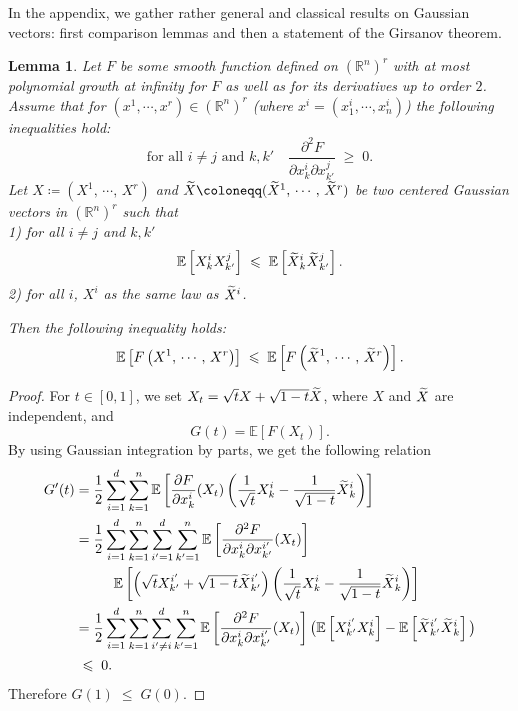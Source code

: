 \documentclass[10pt]{amsart}
\newtheorem{lemm}[theo]{Lemma}\newtheorem{prop}[theo]{Proposition}\newtheorem{coro}[theo]{Corollary}\newtheorem{conj}[theo]{Conjecture}
\theoremstyle{definition}\newtheorem{defi}[theo]{Definition}\newtheorem{rema}[theo]{Remark}\newtheorem{exam}[theo]{Example}\newtheorem{exem}[theo]{Example}\newtheorem{nota}[theo]{Notation}
\renewcommand{\tilde}{\widetilde}
\renewcommand{\leq}{\;\leqslant\;}
\renewcommand{\geq}{\;\geqslant\;}
\newcommand{\R}{\mathbb{R}}
\newcommand{\E}{\mathbb{E}}
\newcommand*\green[1]{#1}
\let\oldtilde\tilde
\renewcommand*{\tilde}[1]{\mathchoice{\widetilde{#1}}{\widetilde{#1}}{\oldtilde{#1}}{\oldtilde{#1}}}
\begin{document}
In the appendix, we gather rather general and classical results on Gaussian vectors: first comparison lemmas and then a statement of the Girsanov theorem.

\begin{lemm}\label{kah2}
Let $F$ be some smooth function defined on $(\R^n)^{\green r}$ with at most polynomial growth at infinity for $F$ as well as for its derivatives up to order $2$. Assume that for $(x^1, \cdots, x^{\green r}) \in (\R^n)^{\green r}$ (where $x^i= (x^i_1, \cdots, x^i_n)$) the following inequalities hold:
\begin{equation*}
\text{for all $i \not = j$ and $k,k'$}\quad \frac{\partial^2 F}{\partial x^i_k \partial x^j_{k'} } \geq 0.
\end{equation*}
Let $X\coloneqq (X^1,\,\cdots,\, X^{\green r})$ and $\tilde X\coloneqq (\tilde{X}^1,\, \cdots,\, \tilde{X}^{\green r})$ be two centered Gaussian vectors in $(\R^n)^{\green r}$ such that \\
1) for all $i \not = j$ and $k,k'$
\begin{equation*}
\E\left[X^i_k X^j_{k'}\right] \leq \E\left[\tilde{X}^i_k\tilde{X}^j_{k'}\right].
\end{equation*}
2) for all $i $, $X^i$ as the same law as $\tilde{X}^i$.

Then the following inequality holds:
\begin{equation*}
\E\left[F\left(X^1,\,\cdots,\, X^{r}\right)\right] \leq \E\left[F\left(\tilde{X}^1,\, \cdots,\, \tilde{X}^{r}\right)\right].
\end{equation*}
\end{lemm}


\begin{proof} 
For $t\in [0,1]$, we set $X_t= \sqrt{t} X+\sqrt{1-t} \tilde{X}$, where $X$ and $\tilde{X}$ are independent, and
\begin{equation*}
G(t)= \E[F(X_t)].
\end{equation*}
By using Gaussian integration by parts, we get the following relation
\begin{align*}
G'(t)
& = \frac{1}{2} \sum_{i=1}^d \sum_{k=1}^n \E \left[\frac{\partial F} {\partial x^i_k } (X_t) \left(\frac{1}{\sqrt t} X^i_k - \frac{1}{\sqrt {1-t}} \tilde{X}^i_k\right) \right] \\
& = \frac{1}{2} \sum_{i=1}^d \sum_{k=1}^n \sum_{i'=1}^d \sum_{k'=1}^n \E \left [\frac{\partial^2 F} {\partial x^i_k \partial x^{i'}_{k'} } (X_t) \right]\\
&\mkern50mu\E \left [\left(\sqrt t X^{i'}_{k'} +\sqrt {1-t} \tilde{X}^{i'}_{k'}\right) \left(\frac{1}{\sqrt t} X^i_k - \frac{1}{\sqrt {1-t}} \tilde{X}^i_k\right) \right] \\
& = \frac{1}{2} \sum_{i=1}^d \sum_{k=1}^n \sum_{i' \not =i}^d \sum_{k'=1}^n \E \left [\frac{\partial^2 F} {\partial x^i_k \partial x^{i'}_{k'} } (X_t) \right] \big(\E \left[X^{i'}_{k'} X^i_k\right] -\E \left[\tilde{X}^{i'}_{k'} \tilde{X}^i_k\right] \big) \\
& \leq 0.
\end{align*}
Therefore $G(1)\leq G(0)$.
\end{proof}
\end{document}
